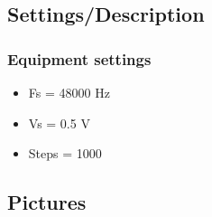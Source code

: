 \subsection{Settings/Description}
\subsubsection{Equipment settings}
\label{Eqp_Sett_FIR}
\begin{itemize}
	\item Fs = 48000 Hz
	\item Vs = 0.5 V
	\item Steps = 1000
\end{itemize}

\subsection{Pictures}
